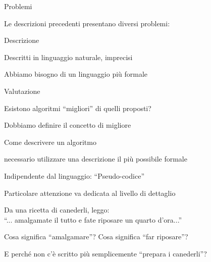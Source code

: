 \begin{frame}{Problemi}

Le descrizioni precedenti presentano diversi problemi:

\BIL
\item {\large\alert{Descrizione}}
\BI
\item Descritti in linguaggio naturale, imprecisi
\item Abbiamo bisogno di un linguaggio più formale
\EI
\item {\large\alert{Valutazione}}
\BI
\item Esistono algoritmi “migliori” di quelli proposti?
\item Dobbiamo definire il concetto di migliore
\EI
\EIL

\end{frame}

\begin{frame}{Come descrivere un algoritmo}

\BIL
\item \EE necessario utilizzare una descrizione il più possibile formale
\item Indipendente dal linguaggio: “\alert{Pseudo-codice}”
\item Particolare attenzione va dedicata al livello di dettaglio
\BI
\item Da una ricetta di canederli, leggo:\\
“... amalgamate il tutto e fate riposare un quarto d'ora...”
\item Cosa significa “amalgamare”? Cosa significa “far riposare”? 
\item E perché non c'è scritto più semplicemente “prepara i canederli”?
\EI
\EIL

\end{frame}

